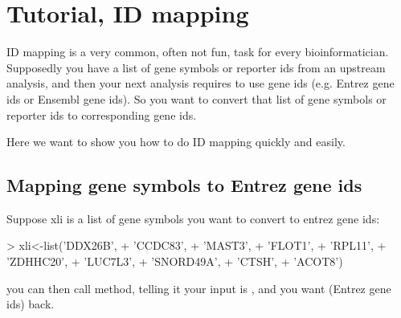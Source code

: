 \documentclass[12pt]{article}
\begin{document}
   
\section{Tutorial, ID mapping}


ID mapping is a very common, often not fun, task for every bioinformatician. Supposedly you have a list of gene symbols or reporter ids from an upstream analysis, and then your next analysis requires to use gene ids (e.g. Entrez gene ids or Ensembl gene ids). So you want to convert that list of gene symbols or reporter ids to corresponding gene ids.

Here we want to show you how to do ID mapping quickly and easily. 

\subsection{Mapping gene symbols to Entrez gene ids}

Suppose xli is a list of gene symbols you want to convert to entrez gene ids:

\begin{Schunk}
\begin{Sinput}
> xli<-list('DDX26B',
+  'CCDC83',
+  'MAST3',
+  'FLOT1',
+  'RPL11',
+  'ZDHHC20',
+  'LUC7L3',
+  'SNORD49A',
+  'CTSH',
+  'ACOT8')
\end{Sinput}
\end{Schunk}

you can then call  method, telling it your input is , and you want  (Entrez gene ids) back.
\end{document}
